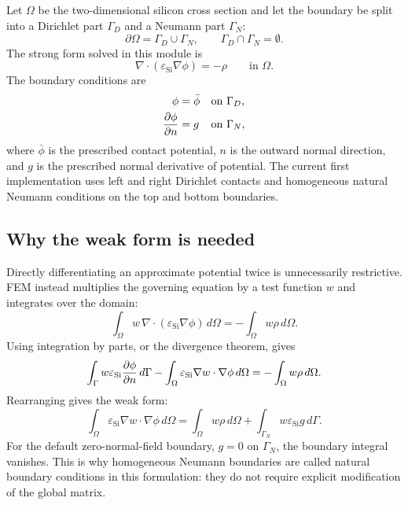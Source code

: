 \documentclass[11pt]{article}
\begin{document}
Let $\Omega$ be the two-dimensional silicon cross section and let the boundary be split into a Dirichlet part $\Gamma_D$ and a Neumann part $\Gamma_N$:
\begin{equation}
\partial \Omega = \Gamma_D \cup \Gamma_N, \qquad \Gamma_D \cap \Gamma_N = \emptyset.
\end{equation}
The strong form solved in this module is
\begin{equation}
\nabla \cdot (\varepsilon_{\mathrm{Si}} \nabla \phi) = -\rho \qquad \text{in } \Omega.
\end{equation}
The boundary conditions are
\begin{align}
\phi &= \bar{\phi} && \text{on } \Gamma_D, \\
\pdv{\phi}{n} &= g && \text{on } \Gamma_N,
\end{align}
where $\bar{\phi}$ is the prescribed contact potential, $n$ is the outward normal direction, and $g$ is the prescribed normal derivative of potential. The current first implementation uses left and right Dirichlet contacts and homogeneous natural Neumann conditions on the top and bottom boundaries.

\subsection{Why the weak form is needed}

Directly differentiating an approximate potential twice is unnecessarily restrictive. FEM instead multiplies the governing equation by a test function $w$ and integrates over the domain:
\begin{equation}
\int_{\Omega} w \, \nabla \cdot (\varepsilon_{\mathrm{Si}} \nabla \phi) \, d\Omega
= -\int_{\Omega} w \rho \, d\Omega.
\end{equation}
Using integration by parts, or the divergence theorem, gives
\begin{equation}
\int_{\Gamma} w \varepsilon_{\mathrm{Si}} \pdv{\phi}{n} \, d\Gamma
-
\int_{\Omega} \varepsilon_{\mathrm{Si}} \nabla w \cdot \nabla \phi \, d\Omega
= -\int_{\Omega} w \rho \, d\Omega.
\end{equation}
Rearranging gives the weak form:
\begin{equation}
\boxed{
\int_{\Omega} \varepsilon_{\mathrm{Si}} \nabla w \cdot \nabla \phi \, d\Omega
= \int_{\Omega} w \rho \, d\Omega
+ \int_{\Gamma_N} w \varepsilon_{\mathrm{Si}} g \, d\Gamma .
}
\end{equation}
For the default zero-normal-field boundary, $g=0$ on $\Gamma_N$, the boundary integral vanishes. This is why homogeneous Neumann boundaries are called natural boundary conditions in this formulation: they do not require explicit modification of the global matrix.
\end{document}
